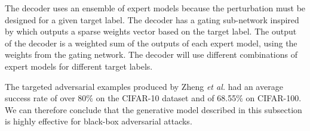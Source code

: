 The decoder uses an ensemble of expert models because the perturbation must be designed for a given target label. The decoder has a gating sub-network inspired by \cite{experts_mixture_gate} which outputs a sparse weights vector based on the target label. The output of the decoder is a weighted sum of the outputs of each expert model, using the weights from the gating network. The decoder will use different combinations of expert models for different target labels.

The targeted adversarial examples produced by Zheng \textit{et al.} \cite{zheng_black_box_GAN} had an average success rate of over 80\% on the CIFAR-10 dataset and of 68.55\% on CIFAR-100. We can therefore conclude that the generative model described in this subsection is highly effective for black-box adversarial attacks. 


